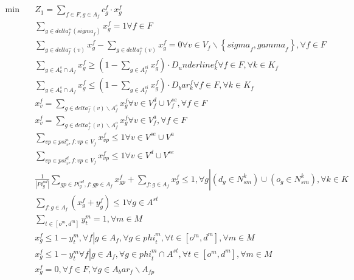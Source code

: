 \begin{align}
  \min\quad & Z_{1} = \sum_{f \in F, g \in A_{f}} c_{g}^{f} \cdot x_{g}^{f} \tag{eq\_0001} \\
  & \sum_{g \in \mathit{delta}_{f}^{+} \left(\mathit{sigma}_{f}\right)} x_{g}^{f} = 1 \forall f \in F \tag{eq\_0005} \\
  & \sum_{g \in \mathit{delta}_{f}^{-} \left(v\right)} x_{g}^{f} - \sum_{g \in \mathit{delta}_{f}^{+} \left(v\right)} x_{g}^{f} = 0 \forall v \in V_{f} \backslash \left\{\mathit{sigma}_{f} , \mathit{gamma}_{f}\right\} , \forall f \in F \tag{eq\_0007} \\
  & \sum_{g \in A_{k}^{s} \cap A_{f}} x_{g}^{f} \geq \left(1 - \sum_{g \in A_{f}^{v i}} x_{g}^{f}\right) \cdot D_underline_{k}^{f} \forall f \in F , \forall k \in K_{f} \tag{eq\_0008} \\
  & \sum_{g \in A_{k}^{s} \cap A_{f}} x_{g}^{f} \leq \left(1 - \sum_{g \in A_{f}^{v i}} x_{g}^{f}\right) \cdot D_bar_{k}^{f} \forall f \in F , \forall k \in K_{f} \tag{eq\_0010} \\
  & x_{v}^{f} = \sum_{g \in \mathit{delta}_{f}^{-} \left(v\right) \backslash A_{f}^{e}} x_{g}^{f} \forall v \in V_{f}^{d} \cup V_{f}^{s e} , \forall f \in F \tag{eq\_0011} \\
  & x_{v}^{f} = \sum_{g \in \mathit{delta}_{f}^{+} \left(v\right) \backslash A_{f}^{o}} x_{g}^{f} \forall v \in V_{f}^{a} , \forall f \in F \tag{eq\_0013} \\
  & \sum_{vp \in \mathit{psi}_{v}^{a}, f : vp \in V_{f}} x_{vp}^{f} \leq 1 \forall v \in V^{s e} \cup V^{a} \tag{eq\_0014} \\
  & \sum_{vp \in \mathit{psi}_{v}^{d}, f : vp \in V_{f}} x_{vp}^{f} \leq 1 \forall v \in V^{d} \cup V^{s e} \tag{eq\_0016} \\
  & \frac{1}{\left|\mathit{Pi}_{g}^{a d}\right|} \sum_{gp \in \mathit{Pi}_{g}^{a d}, f : gp \in A_{f}} x_{gp}^{f} + \sum_{f : g \in A_{f}} x_{g}^{f} \leq 1 , \forall g \left|\right. \left(d_{g} \in N_{s m}^{k}\right) \cup \left(o_{g} \in N_{s m}^{k}\right) , \forall k \in K \tag{eq\_0029} \\
  & \sum_{f : g \in A_{f}} \left(x_{g}^{f} + y_{g}^{f}\right) \leq 1 \forall g \in A^{s t} \tag{eq\_0032} \\
  & \sum_{t \in \left[o^{m} , d^{m}\right]} y_{t}^{m} = 1 , \forall m \in M \tag{eq\_0033} \\
  & x_{g}^{f} \leq 1 - y_{t}^{m} , \forall f \left|\right. g \in A_{f} , \forall g \in \mathit{phi}_{t}^{m} , \forall t \in \left[o^{m} , d^{m}\right] , \forall m \in M \tag{eq\_0034} \\
  & x_{g}^{f} \leq 1 - y_{t}^{m} \forall f \left|\right. g \in A_{f} , \forall g \in \mathit{phi}_{t}^{m} \cap A^{s t} , \forall t \in \left[o^{m} , d^{m}\right] , \forall m \in M \tag{eq\_0037} \\
  & x_{g}^{f} = 0 , \forall f \in F , \forall g \in A_bar_{f} \backslash A_{f p} \tag{eq\_0043\_b} \\
\end{align}

